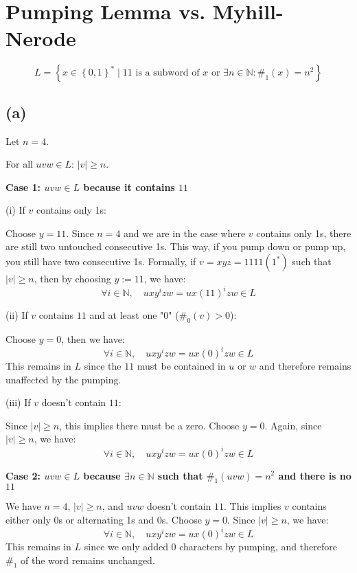 



\setcounter{section}{2}

\section{Pumping Lemma vs. Myhill-Nerode}

$$L = \left\{ x \in \left\{0,1\right\}^{\ast} \mid 11\text{ is a subword of }x\text{ or } \exists n \in \mathbb{N}:\#_{1}(x)=n^{2}\right\}$$

\subsection{(a)}
Let \( n = 4 \).

For all \( uvw \in L \): \( |v| \geq n \).

\textbf{Case 1: \( uvw \in L \) because it contains \( 11 \)}

(i) If \( v \) contains only 1s:

Choose \( y = 11 \). Since \( n = 4 \) and we are in the case where \( v \) contains only 1s, there are still two untouched consecutive 1s. This way, if you pump down or pump up, you still have two consecutive 1s. Formally, if \( v = xyz = 1111(1^*) \) such that \( |v| \geq n \), then by choosing \( y := 11 \), we have:
\[
\forall i \in \mathbb{N}, \quad uxy^i zw = ux(11)^i zw \in L
\]

(ii) If \( v \) contains \( 11 \) and at least one "0" (\( \#_0(v) > 0 \)):

Choose \( y = 0 \), then we have:
\[
\forall i \in \mathbb{N}, \quad uxy^i zw = ux(0)^i zw \in L
\]
This remains in $L$ since the $11$ must be contained in $u$ or $w$ and therefore remains unaffected by the pumping.

(iii) If \( v \) doesn’t contain \( 11 \):

Since \( |v| \geq n \), this implies there must be a zero. Choose \( y = 0 \). Again, since \( |v| \geq n \), we have:
\[
\forall i \in \mathbb{N}, \quad uxy^i zw = ux(0)^i zw \in L
\]

\textbf{Case 2: \( uvw \in L \) because \( \exists n \in \mathbb{N} \) such that \( \#_{1}(uvw) = n^2 \) and there is no \( 11 \)}

We have \( n = 4 \), \( |v| \geq n \), and \( uvw \) doesn’t contain \( 11 \). This implies \( v \) contains either only 0s or alternating 1s and 0s. Choose \( y = 0 \). Since \( |v| \geq n \), we have:
\[
\forall i \in \mathbb{N}, \quad uxy^i zw = ux(0)^i zw \in L
\]
This remains in $L$ since we only added $0$ characters by pumping, and therefore $\#_{1}$ of the word remains unchanged.


